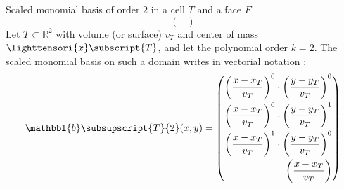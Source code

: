 \begin{exemplebox}{Scaled monomial basis of order $2$ in a cell $T$ and a face $F$}
\begin{equation}
\begin{pmatrix}
                \end{pmatrix}
            \end{equation}
            Let $T \subset \mathbb{R}^2$ with volume (or surface) $v_T$ and center of mass $\lighttensori{x}\subscript{T}$, and let the polynomial order $k = 2$. The scaled monomial basis on such a domain writes in vectorial notation :
            \begin{equation}
                {\mathbbl{b}}\subsupscript{T}{2}(x,y) = 
                \begin{pmatrix}
                    \begin{aligned}
                        \begin{pmatrix}
                            \displaystyle
                            \frac{x - x_T}{v_T}
                        \end{pmatrix}^0
                        \cdot
                        \begin{pmatrix}
                            \displaystyle
                            \frac{y - y_T}{v_T}
                        \end{pmatrix}^0
                        \\
                        \begin{pmatrix}
                            \displaystyle
                            \frac{x - x_T}{v_T}
                        \end{pmatrix}^0
                        \cdot
                        \begin{pmatrix}
                            \displaystyle
                            \frac{y - y_T}{v_T}
                        \end{pmatrix}^1
                        \\
                        \begin{pmatrix}
                            \displaystyle
                            \frac{x - x_T}{v_T}
                        \end{pmatrix}^1
                        \cdot
                        \begin{pmatrix}
                            \displaystyle
                            \frac{y - y_T}{v_T}
                        \end{pmatrix}^0
                        \\
                        \begin{pmatrix}
                            \displaystyle
                            \frac{x - x_T}{v_T}

\end{pmatrix}
\end{aligned}
\end{pmatrix}
\end{equation}
\end{exemplebox}
